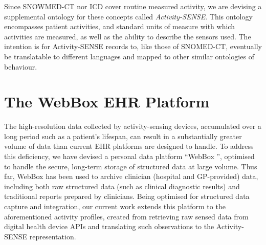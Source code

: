 \documentclass{chi-ext}
\begin{document}
Since SNOWMED-CT nor ICD cover routine measured activity, we are devising a supplemental ontology for these concepts called \emph{Activity-SENSE}.  This ontology encompasses patient activities, and standard units of measure with which activities are measured, as well as the ability to describe the sensors used.  The intention is for Activity-SENSE records to, like those of SNOMED-CT, eventually be translatable to different languages and mapped to other similar ontologies of behaviour.

\section{The WebBox EHR Platform}

The high-resolution data collected by activity-sensing devices, accumulated over a long period such as a patient's lifespan, can result in a substantially greater volume of data than current EHR platforms are designed to handle. To address this deficiency, we have devised a personal data platform ``WebBox \cite{webbox}'', optimised to handle the secure, long-term storage of structured data at large volume.  Thus far, WebBox has been used to archive clinician (hospital and GP-provided) data, including both raw structured data (such as clinical diagnostic results) and traditional reports prepared by clinicians.  Being optimised for structured data capture and integration, our current work extends this platform to the aforementioned activity profiles, created from retrieving raw sensed data from digital health device APIs and translating such observations to the Activity-SENSE representation.  





\end{document}
